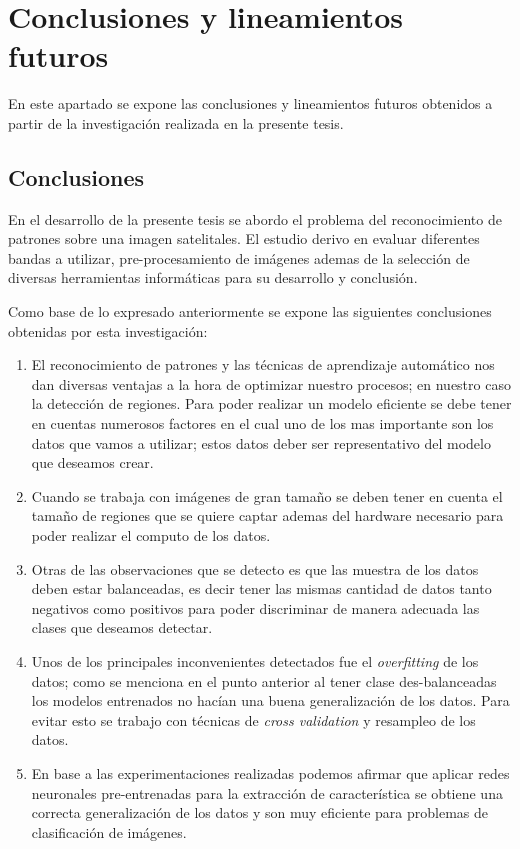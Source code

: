 \chapter{Conclusiones y lineamientos futuros}\label{chap:conclusiones}
En este apartado se expone las conclusiones y lineamientos futuros obtenidos a partir de la investigación realizada en la presente tesis. 

\section{Conclusiones}
En el desarrollo de la presente tesis se abordo el problema del reconocimiento de patrones sobre una imagen satelitales. El estudio derivo en evaluar diferentes bandas a utilizar, pre-procesamiento de imágenes ademas de la selección de diversas herramientas informáticas para su desarrollo y conclusión.

Como base de lo expresado anteriormente se expone las siguientes conclusiones obtenidas por esta investigación:
\begin{enumerate}
\item El reconocimiento de patrones y las técnicas de aprendizaje automático nos dan diversas ventajas a la hora de optimizar nuestro procesos; en nuestro caso la detección de regiones. Para poder realizar un modelo eficiente se debe tener en cuentas numerosos factores en el cual uno de los mas importante son los datos que vamos a utilizar; estos datos deber ser representativo del modelo que deseamos crear.

\item Cuando se trabaja con imágenes de gran tamaño se deben tener en cuenta el tamaño de regiones que se quiere captar ademas del hardware necesario para poder realizar el computo de los datos.

\item Otras de las observaciones que se detecto es que las muestra de los datos deben estar balanceadas, es decir tener las mismas cantidad de datos tanto negativos como positivos para poder discriminar de manera adecuada las clases que deseamos detectar.

\item Unos de los principales inconvenientes detectados fue el \textit{overfitting} de los datos; como se menciona en el punto anterior al tener clase des-balanceadas los modelos entrenados no hacían una buena generalización de los datos. Para evitar esto se trabajo con técnicas de \textit{cross validation} y resampleo de los datos.

\item En base a las experimentaciones realizadas podemos afirmar que aplicar redes neuronales pre-entrenadas para la extracción de característica se obtiene una correcta generalización de los datos y son muy eficiente para problemas de clasificación de imágenes.

\end{enumerate}

